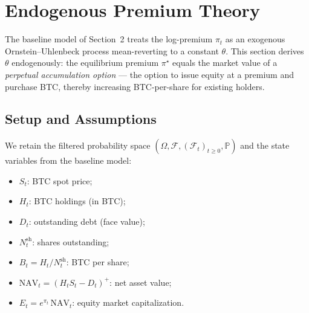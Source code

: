 %

\newtheorem{theorem}{Theorem}[section]
\newtheorem{proposition}[theorem]{Proposition}
\newtheorem{lemma}[theorem]{Lemma}
\newtheorem{corollary}[theorem]{Corollary}
\newtheorem{definition}[theorem]{Definition}
\newtheorem{assumption}[theorem]{Assumption}
\newtheorem{remark}[theorem]{Remark}

\section{Endogenous Premium Theory}
\label{sec:endogenous_premium}

The baseline model of Section~2 treats the log-premium $\pi_t$ as an
exogenous Ornstein--Uhlenbeck process mean-reverting to a constant $\theta$.
This section derives $\theta$ endogenously: the equilibrium premium
$\pi^\star$ equals the market value of a \emph{perpetual accumulation option}
--- the option to issue equity at a premium and purchase BTC, thereby
increasing BTC-per-share for existing holders.

\subsection{Setup and Assumptions}
\label{sec:endo_setup}

We retain the filtered probability space
$(\Omega,\mathcal{F},(\mathcal{F}_t)_{t\ge 0},\mathbb{P})$ and the state
variables from the baseline model:
\begin{itemize}
  \item $S_t$: BTC spot price;
  \item $H_t$: BTC holdings (in BTC);
  \item $D_t$: outstanding debt (face value);
  \item $N_t^{\mathrm{sh}}$: shares outstanding;
  \item $B_t = H_t / N_t^{\mathrm{sh}}$: BTC per share;
  \item $\mathrm{NAV}_t = (H_t S_t - D_t)^+$: net asset value;
  \item $E_t = e^{\pi_t}\,\mathrm{NAV}_t$: equity market capitalization.
\end{itemize}

